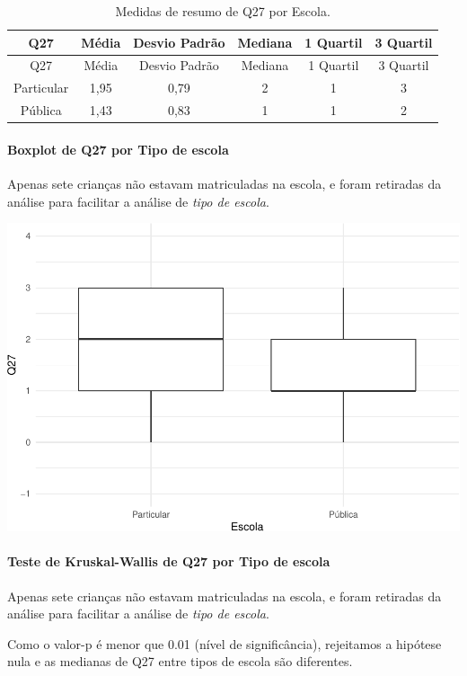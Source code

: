 \documentclass[]{article}
\let\oldparagraph\paragraph
\renewcommand{\paragraph}[1]{\oldparagraph{#1}\mbox{}}
\begin{document}
\begin{longtable}[]{@{}cccccc@{}}
\caption{\label{tab:unnamed-chunk-823}Medidas de resumo de Q27 por Escola.}\tabularnewline
\toprule
Q27 & Média & Desvio Padrão & Mediana & 1 Quartil & 3 Quartil\tabularnewline
\midrule
\endfirsthead
\toprule
Q27 & Média & Desvio Padrão & Mediana & 1 Quartil & 3 Quartil\tabularnewline
\midrule
\endhead
Particular & 1,95 & 0,79 & 2 & 1 & 3\tabularnewline
Pública & 1,43 & 0,83 & 1 & 1 & 2\tabularnewline
\bottomrule
\end{longtable}

\hypertarget{boxplot-de-q27-por-tipo-de-escola}{%
\paragraph{Boxplot de Q27 por Tipo de escola}\label{boxplot-de-q27-por-tipo-de-escola}}

Apenas sete crianças não estavam matriculadas na escola, e foram retiradas da análise para facilitar a análise de \emph{tipo de escola}.

\begin{center}\includegraphics[width=0.75\linewidth]{relatorio_covid19_files/figure-latex/unnamed-chunk-824-1} \end{center}

\hypertarget{teste-de-kruskal-wallis-de-q27-por-tipo-de-escola}{%
\paragraph{Teste de Kruskal-Wallis de Q27 por Tipo de escola}\label{teste-de-kruskal-wallis-de-q27-por-tipo-de-escola}}

Apenas sete crianças não estavam matriculadas na escola, e foram retiradas da análise para facilitar a análise de \emph{tipo de escola}.

Como o valor-p é menor que 0.01 (nível de significância), rejeitamos a hipótese nula e as medianas de Q27 entre tipos de escola são diferentes.
\end{document}
